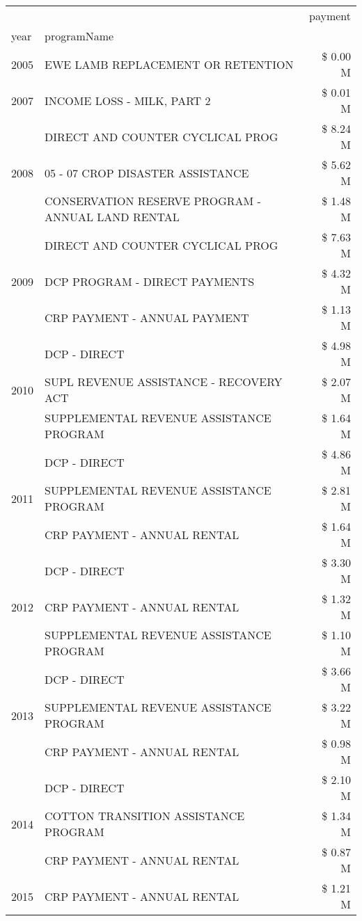 \begin{tabular}{llr}
\toprule
 &  & payment \\
year & programName &  \\
\midrule
2005 & EWE LAMB REPLACEMENT OR RETENTION & \$ 0.00 M \\
\cline{1-3}
2007 & INCOME LOSS - MILK, PART 2 & \$ 0.01 M \\
\cline{1-3}
\multirow[t]{3}{*}{2008} & DIRECT AND COUNTER CYCLICAL PROG & \$ 8.24 M \\
 & 05 - 07 CROP DISASTER ASSISTANCE & \$ 5.62 M \\
 & CONSERVATION RESERVE PROGRAM - ANNUAL LAND RENTAL & \$ 1.48 M \\
\cline{1-3}
\multirow[t]{3}{*}{2009} & DIRECT AND COUNTER CYCLICAL PROG & \$ 7.63 M \\
 & DCP PROGRAM - DIRECT PAYMENTS & \$ 4.32 M \\
 & CRP PAYMENT - ANNUAL PAYMENT & \$ 1.13 M \\
\cline{1-3}
\multirow[t]{3}{*}{2010} & DCP - DIRECT & \$ 4.98 M \\
 & SUPL REVENUE ASSISTANCE - RECOVERY ACT & \$ 2.07 M \\
 & SUPPLEMENTAL REVENUE ASSISTANCE PROGRAM & \$ 1.64 M \\
\cline{1-3}
\multirow[t]{3}{*}{2011} & DCP - DIRECT & \$ 4.86 M \\
 & SUPPLEMENTAL REVENUE ASSISTANCE PROGRAM & \$ 2.81 M \\
 & CRP PAYMENT - ANNUAL RENTAL & \$ 1.64 M \\
\cline{1-3}
\multirow[t]{3}{*}{2012} & DCP - DIRECT & \$ 3.30 M \\
 & CRP PAYMENT - ANNUAL RENTAL & \$ 1.32 M \\
 & SUPPLEMENTAL REVENUE ASSISTANCE PROGRAM & \$ 1.10 M \\
\cline{1-3}
\multirow[t]{3}{*}{2013} & DCP - DIRECT & \$ 3.66 M \\
 & SUPPLEMENTAL REVENUE ASSISTANCE PROGRAM & \$ 3.22 M \\
 & CRP PAYMENT - ANNUAL RENTAL & \$ 0.98 M \\
\cline{1-3}
\multirow[t]{3}{*}{2014} & DCP - DIRECT & \$ 2.10 M \\
 & COTTON TRANSITION ASSISTANCE PROGRAM & \$ 1.34 M \\
 & CRP PAYMENT - ANNUAL RENTAL & \$ 0.87 M \\
\cline{1-3}
\multirow[t]{3}{*}{2015} & CRP PAYMENT - ANNUAL RENTAL & \$ 1.21 M \\

\end{tabular}
